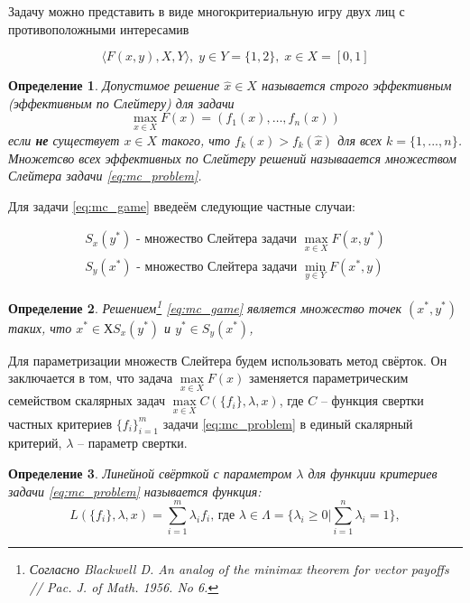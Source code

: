 \begin{flushleft}
\vspace{5mm} 
Задачу можно представить в виде многокритериальную игру двух лиц 
с противоположными интересамив 

\begin{equation}
	\bigg \langle F(x,y), X, Y \bigg \rangle, \; y \in Y=\{1, 2\}, \; x \in {X}=[0, 1]
	\label{eq:mc_game}
\end{equation}

\newtheorem{Def}{Определение}
\begin{Def}
	Допустимое решение $\hat{x}\in{X}$ называется 
	строго эффективным (эффективным по Слейтеру) для задачи
	\begin{equation}
		\max\limits_{x \in X} F(x)=({f}_1(x),\ldots, {f}_n(x))
		\label{eq:mc_problem}
	\end{equation}
	если \textbf{не} существует $x\in{X}$ такого, что 
	$f_k(x)>f_k(\hat{x})$ для всех $k=\{1,...,n\}$. Множетсво всех эффективных по
	Слейтеру решений называается \textit{множеством Слейтера} задачи \eqref{eq:mc_problem}.
\end{Def}

Для задачи \eqref{eq:mc_game} введеём следующие частные случаи:

\begin{gather*}
	S_x(y^*) \textrm{ - множество Слейтера задачи } \max\limits_{x \in X} F(x, y^*) \\
	S_y(x^*) \textrm{ - множество Слейтера задачи } \min\limits_{y \in Y} F(x^*, y)
\end{gather*}

\begin{Def}
	Решением\footnote {
	Согласно \textit{Blackwell D.} An analog of the minimax theorem for
    vector payoffs // Pac. J. of Math. 1956. No 6.
	} 
	\eqref{eq:mc_game} является множество точек $(x^*, y^*)$ таких, что
    $x^* \in Х S_x(y^*) $ и $ y^*  \in S_y (x^*)$, 
\end{Def}

\vspace{5mm}

\qquad Для параметризации множеств Слейтера будем использовать метод свёрток.
Он заключается в том, что задача $\max\limits_{x \in X} F(x)$ заменяется параметрическим 
семейством скалярных задач $\max\limits_{x \in X} C(\{f_i\}, \lambda, x)$, \newline 
где $C$ – функция свертки частных критериев $\{f_i\}_{i=1}^m$ задачи 
\eqref{eq:mc_problem} в единый скалярный критерий, $\lambda$ – параметр свертки. 

\begin{Def}
	Линейной свёрткой с параметром $\lambda$ для функции критериев задачи
	\eqref{eq:mc_problem} называется функция:
	\begin{equation}
		L(\{f_i\}, \lambda, x)=\sum_{i=1}^{m} \lambda_i f_i \textrm{, где }
		\lambda \in \Lambda =\{\lambda_i \geq 0 | \sum_{i=1}^n \lambda_i =1 \},
	\end{equation}


\end{Def}
\end{flushleft}
